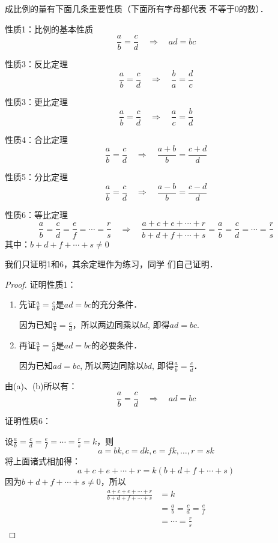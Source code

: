 成比例的量有下面几条重要性质（下面所有字母都代表
不等于0的数）．

\begin{blk}{性质1：比例的基本性质}
\[\frac{a}{b}=\frac{c}{d}\quad \Rightarrow\quad ad=bc\]    
\end{blk}

\begin{blk}{性质3：反比定理}
    \[\frac{a}{b}=\frac{c}{d}\quad \Rightarrow\quad \frac{b}{a}=\frac{d}{c}\]       
\end{blk}

\begin{blk}{性质3：更比定理}
    \[\frac{a}{b}=\frac{c}{d}\quad \Rightarrow\quad \frac{a}{c}=\frac{b}{d}\] 
\end{blk}

\begin{blk}{性质4：合比定理}
    \[\frac{a}{b}=\frac{c}{d}\quad \Rightarrow\quad \frac{a+b}{b}=\frac{c+d}{d}\] 
\end{blk}

\begin{blk}{性质5：分比定理}
    \[\frac{a}{b}=\frac{c}{d}\quad \Rightarrow\quad \frac{a-b}{b}=\frac{c-d}{d}\] 
\end{blk}

\begin{blk}{性质6：等比定理}
    \[\frac{a}{b}=\frac{c}{d}=\frac{e}{f}=\cdots=\frac{r}{s}\quad \Rightarrow\quad \frac{a+c+e+\cdots+r}{b+d+f+\cdots+s}=\frac{a}{b}=\frac{c}{d}=\cdots=\frac{r}{s}\] 
其中：$b+d+f+\cdots+s\ne 0$
\end{blk}

我们只证明1和6，其余定理作为练习，同学
们自己证明．

\begin{proof}
证明性质1：
\begin{enumerate}
    \item 先证$\frac{a}{b}=\frac{c}{d}$是$ad=bc$的充分条件．

    因为已知$\frac{a}{b}=\frac{c}{d}$，所以两边同乘以$bd$, 即得$ad=bc$.
\item     再证$\frac{a}{b}=\frac{c}{d}$是$ad=bc$的必要条件．

因为已知$ad=bc$, 所以两边同除以$bd$, 即得$\frac{a}{b}=\frac{c}{d}$．
\end{enumerate}

由(a)、(b)所以有：
\[\frac{a}{b}=\frac{c}{d}\quad \Rightarrow\quad ad=bc\]    

证明性质6：

设$\frac{a}{b}=\frac{c}{d}=\frac{e}{f}=\cdots=\frac{r}{s}=k$，则
\[a=bk, c=dk, e=fk, \ldots, r=sk\] 
将上面诸式相加得：
\[a+c+e+\cdots+r=k(b+d+f+\cdots+s)\]
因为$b+d+f+\cdots+s\ne 0$，所以
\[\begin{split}
    \frac{a+c+e+\cdots+r}{b+d+f+\cdots+s}&=k\\
    &=\frac{a}{b}=\frac{c}{d}=\frac{e}{f}\\
    &=\cdots=\frac{r}{s}
\end{split}
    \]
\end{proof}



